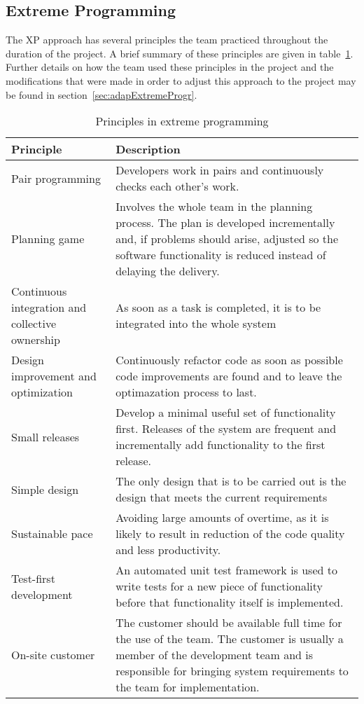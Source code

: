 \subsection{Extreme Programming}
The XP approach has several principles the team practiced throughout the duration of the project. A brief summary of these principles are given in table~\ref{tab:exProg}. Further details on how the team used these principles in the project and the modifications that were made in order to adjust this approach to the project may be found in section~\ref{sec:adapExtremeProgr}.

\begin{table}[H]
\begin{tabular}{|p{4cm}|p{11.7cm}|}
\hline
\textbf{Principle} & \textbf{Description} \\\hline
Pair programming & Developers work in pairs and continuously checks each other's work.\\\hline
Planning game & Involves the whole team in the planning process. The plan is developed incrementally and, if problems should arise, adjusted so the software functionality is reduced instead of delaying the delivery.
\\\hline
Continuous integration and collective ownership& As soon as a task is completed, it is to be integrated into the whole system\\\hline
Design improvement and optimization & Continuously refactor code as soon as possible code improvements are found and to leave the optimazation process to last. \\\hline
Small releases & Develop a minimal useful set of functionality first. Releases of the system are frequent and incrementally add functionality to the first release.\\\hline
Simple design & The only design that is to be carried out is the design that meets the current requirements\\\hline
Sustainable pace & Avoiding large amounts of overtime, as it is likely to result in reduction of the code quality and less productivity. \\\hline
Test-first development & An automated unit test framework is used to write tests for a new piece of functionality before that functionality itself is implemented. \\\hline
On-site customer & The customer should be available full time for the use of the team. The customer is usually a member of the development team and is responsible for bringing system requirements to the team for implementation.\\\hline
\end{tabular}
\caption{Principles in extreme programming}
\label{tab:exProg}
\end{table}
